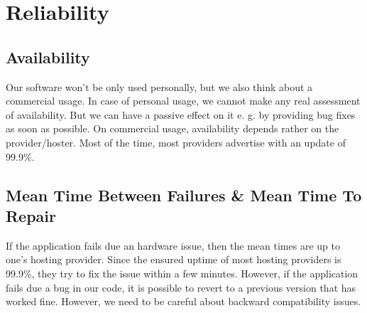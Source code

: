 \documentclass[a4paper,12pt,chapterprefix=false,bibliography=totoc,listof=totoc,]{scrreprt}
\begin{document}
\section{Reliability}


\subsection{Availability}
Our software won't be only used personally, but we also think about a commercial usage.
In case of personal usage, we cannot make any real assessment of availability. But we can have a passive effect on it e. g. by providing bug fixes as soon as possible.
On commercial usage, availability depends rather on the provider/hoster. Most of the time, most providers advertise with an update of 99.9\%.

\subsection{Mean Time Between Failures \& Mean Time To Repair}
If the application fails due an hardware issue, then the mean times are up to one's hosting provider. Since the ensured uptime of most hosting providers is 99.9\%, they try to fix the issue within a few minutes. However, if the application fails due a bug in our code, it is possible to revert to a previous version that has worked fine. However, we need to be careful about backward compatibility issues.
\end{document}
